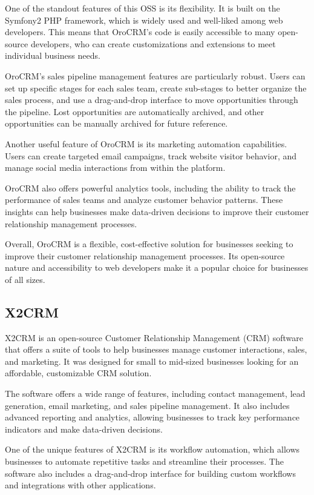 \documentclass{article}
\begin{document}
One of the standout features of this OSS is its flexibility. It is built on the Symfony2 PHP framework, which is widely used and well-liked among web developers. This means that OroCRM's code is easily accessible to many open-source developers, who can create customizations and extensions to meet individual business needs.

OroCRM's sales pipeline management features are particularly robust. Users can set up specific stages for each sales team, create sub-stages to better organize the sales process, and use a drag-and-drop interface to move opportunities through the pipeline. Lost opportunities are automatically archived, and other opportunities can be manually archived for future reference.

Another useful feature of OroCRM is its marketing automation capabilities. Users can create targeted email campaigns, track website visitor behavior, and manage social media interactions from within the platform.

OroCRM also offers powerful analytics tools, including the ability to track the performance of sales teams and analyze customer behavior patterns. These insights can help businesses make data-driven decisions to improve their customer relationship management processes.

Overall, OroCRM is a flexible, cost-effective solution for businesses seeking to improve their customer relationship management processes. Its open-source nature and accessibility to web developers make it a popular choice for businesses of all sizes.

\subsection{X2CRM}

X2CRM is an open-source Customer Relationship Management (CRM) software that offers a suite of tools to help businesses manage customer interactions, sales, and marketing. It was designed for small to mid-sized businesses looking for an affordable, customizable CRM solution.

The software offers a wide range of features, including contact management, lead generation, email marketing, and sales pipeline management. It also includes advanced reporting and analytics, allowing businesses to track key performance indicators and make data-driven decisions.

One of the unique features of X2CRM is its workflow automation, which allows businesses to automate repetitive tasks and streamline their processes. The software also includes a drag-and-drop interface for building custom workflows and integrations with other applications.
\end{document}
